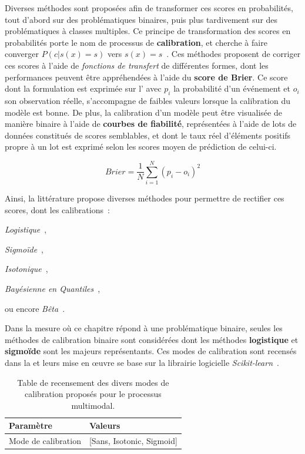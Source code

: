 Diverses méthodes sont proposées afin de transformer ces scores en probabilités, tout d'abord sur des problématiques binaires, puis plus tardivement sur des problématiques à classes multiples. Ce principe de transformation des scores en probabilités porte le nom de processus de \textbf{calibration}, et cherche à faire converger $P(c|s(x)=s)$ vers $s(x)=s$~\cite{Zadrozny2002}. Ces méthodes proposent de corriger ces scores à l'aide de \textit{fonctions de transfert} de différentes formes, dont les performances peuvent être appréhendées à l'aide du \textbf{score de Brier}. Ce score dont la formulation est exprimée sur l' avec $p_i$ la probabilité d'un événement et $o_i$ son observation réelle, s'accompagne de faibles valeurs lorsque la calibration du modèle est bonne. De plus, la calibration d'un modèle peut être visualisée de manière binaire à l'aide de \textbf{courbes de fiabilité}, représentées à l'aide de lots de données constitués de scores semblables, et dont le taux réel d'éléments positifs propre à un lot est exprimé selon les scores moyen de prédiction de celui-ci.\par

\begin{equation} 
    \label{eq:brier_score}
    Brier = \frac{1}{N}\sum\limits _{i=1}^{N}(p_i-o_i)^2 
\end{equation}

Ainsi, la littérature propose diverses méthodes pour permettre de rectifier ces scores, dont les calibrations~:
\begin{inlinerate}
    \item \textit{Logistique}~\cite{Friedman2000},
    \item \textit{Sigmoïde}~\cite{Platt2000,kull2017b},
    \item \textit{Isotonique}~\cite{Zadrozny2002},
    \item \textit{Bayésienne en Quantiles}~\cite{Naeini2015},
    \item ou encore \textit{Bêta}~\cite{Kull2017}.
\end{inlinerate} Dans la mesure où ce chapitre répond à une problématique binaire, seules les méthodes de calibration binaire sont considérées dont les méthodes \textbf{logistique} et \textbf{sigmoïde} sont les majeurs représentants. Ces modes de calibration sont recensés dans la  et leurs mise en œuvre se base sur la librairie logicielle \textit{Scikit-learn}~\cite{pedregosa2011}. 

\begin{table}[H]
    \centering
    \begin{tabular}{ll}
        \toprule 
        Paramètre                   & Valeurs                   \\ \midrule
        Mode de calibration         & [Sans, Isotonic, Sigmoid] \\ \bottomrule
    \end{tabular}
    \caption{Table de recensement des divers modes de calibration proposés pour le processus multimodal.}
    \label{tab:multimodal_calibration_values}
\end{table}
\clearpage

